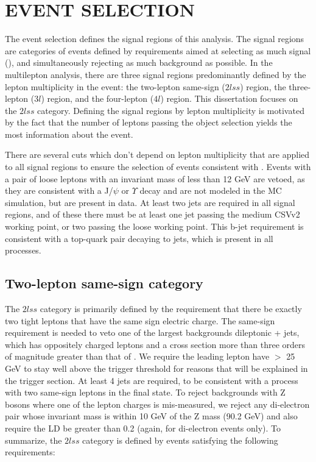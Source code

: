 %
%

\chapter{EVENT SELECTION}
\label{chap:event_selection}
The event selection defines the signal regions of this analysis. The signal regions are categories of events defined by requirements aimed at 
selecting as much signal (\tth), and simultaneously rejecting as much background as possible.
In the multilepton analysis, there are three signal regions predominantly defined by the lepton multiplicity in the event: the two-lepton same-sign ($2lss$) region,
the three-lepton ($3l$) region, and the four-lepton ($4l$) region. This dissertation focuses on the $2lss$ category. Defining the signal regions by lepton multiplicity is motivated
by the fact that the number of leptons passing the object selection yields the most information about the event.

There are several cuts which don't depend on lepton multiplicity that are applied to all signal regions to ensure the selection of events consistent with \tth. Events with
a pair of loose leptons with an invariant mass of less than 12 GeV are vetoed, as they are consistent with a J/$\psi$ or $\Upsilon$ decay and are not modeled in the MC
simulation, but are present in data. At least two jets are required in all signal regions, and of these there must be at least one jet passing the medium CSVv2 working point,
or two passing the loose working point. This b-jet requirement is consistent with a top-quark pair decaying to jets, which is present in all \tth processes. 

\section{Two-lepton same-sign category}
The $2lss$ category is primarily defined by the requirement that there be exactly two tight leptons that have the same sign electric charge. The same-sign requirement is needed to veto 
one of the largest backgrounds dileptonic \ttbar + jets, which has oppositely charged leptons and a cross section more than three orders of magnitude greater than that of \tth. We require
the leading lepton have \pt $>$ 25 GeV to stay well above the trigger threshold for reasons that will be explained in the trigger section. At least 4 jets are required, to be consistent with
a \tth process with two same-sign leptons in the final state. To reject backgrounds with Z bosons where one of the lepton charges is mis-measured, we reject any di-electron pair whose invariant
mass is within 10 GeV of the Z mass (90.2 GeV) and also require the \met LD be greater than 0.2 (again, for di-electron events only). To summarize, the $2lss$ category is defined by events
satisfying the following requirements:


